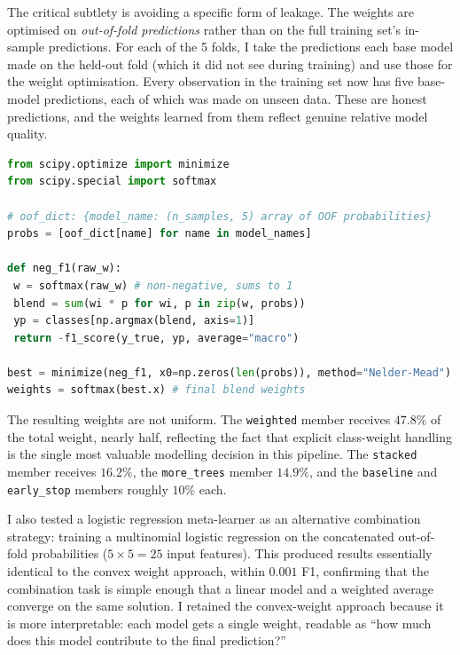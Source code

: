The critical subtlety is avoiding a specific form of leakage. The weights are optimised on \emph{out-of-fold predictions} rather than on the full training set's in-sample predictions. For each of the 5 folds, I take the predictions each base model made on the held-out fold (which it did not see during training) and use those for the weight optimisation. Every observation in the training set now has five base-model predictions, each of which was made on unseen data. These are honest predictions, and the weights learned from them reflect genuine relative model quality.

\begin{lstlisting}[language=Python, caption={Convex blend weight optimisation. Each base model produces a 5-dimensional probability vector per observation. Nelder-Mead finds the weights that minimise cross-entropy on the pooled out-of-fold predictions.}]
from scipy.optimize import minimize
from scipy.special import softmax

# oof_dict: {model_name: (n_samples, 5) array of OOF probabilities}
probs = [oof_dict[name] for name in model_names]

def neg_f1(raw_w):
 w = softmax(raw_w) # non-negative, sums to 1
 blend = sum(wi * p for wi, p in zip(w, probs))
 yp = classes[np.argmax(blend, axis=1)]
 return -f1_score(y_true, yp, average="macro")

best = minimize(neg_f1, x0=np.zeros(len(probs)), method="Nelder-Mead")
weights = softmax(best.x) # final blend weights
\end{lstlisting}

The resulting weights are not uniform. The \texttt{weighted} member receives $47.8\%$ of the total weight, nearly half, reflecting the fact that explicit class-weight handling is the single most valuable modelling decision in this pipeline. The \texttt{stacked} member receives $16.2\%$, the \texttt{more\_trees} member $14.9\%$, and the \texttt{baseline} and \texttt{early\_stop} members roughly $10\%$ each.

I also tested a logistic regression meta-learner as an alternative combination strategy: training a multinomial logistic regression on the concatenated out-of-fold probabilities ($5 \times 5 = 25$ input features). This produced results essentially identical to the convex weight approach, within $0.001$ F1, confirming that the combination task is simple enough that a linear model and a weighted average converge on the same solution. I retained the convex-weight approach because it is more interpretable: each model gets a single weight, readable as ``how much does this model contribute to the final prediction?''

